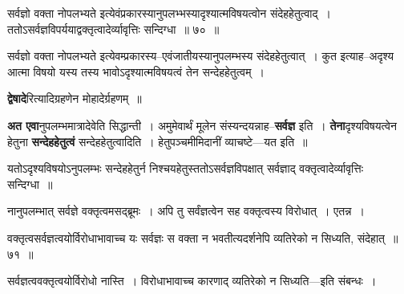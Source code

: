 \documentclass[article,12pt,a4paper]{memoir}
\begin{document}
	  \pstart {}सर्वज्ञो वक्ता नोपलभ्यते इत्येवंप्रकारस्यानुपलभ्भस्यादृश्यात्मविषयत्वोन संदेहहेतुत्वाद् । ततोऽसर्वज्ञविपर्ययाद्वक्तृत्वादेर्व्यावृत्तिः सन्दिग्धा ॥ ७० ॥
	\pend
      
	  \endgroup
	 

	  \pstart सर्वज्ञो वक्ता नोपलभ्यते इत्येवम्प्रकारस्य--एवंजातीयस्यानुपलम्भस्य संदेहहेतुत्वात् । कुत इत्याह--अदृश्य आत्मा विषयो यस्य तस्य भावोऽदृश्यात्मविषयत्वं तेन सन्देहहेतुत्वम् ।
	\pend
      
	  \endgroup
	

	  \pstart \textbf{द्वेषादे}रित्यादिग्रहणेन मोहादेर्ग्रहणम् ॥
	\pend
      

	  \pstart \textbf{अत एवा}नुपलम्भमात्रादेवेति सिद्धान्ती । अमुमेवार्थं मूलेन संस्यन्दयन्नाह--\textbf{सर्वज्ञ} इति । \textbf{तेना}दृश्यविषयत्वेन हेतुना \textbf{सन्देहहेतुत्वं} सन्देहहेतुत्वादिति । हेतुपञ्चमीमिदानीं व्याचष्टे—यत इति ॥
	\pend
	  \bigskip
	  \begingroup
	

	  \pstart यतोऽदृश्यविषयोऽनुपलम्भः सन्देहहेतुर्न निश्चयहेतुस्ततोऽसर्वज्ञविपक्षात् सर्वज्ञाद् वक्तृत्वादेर्व्यावृत्तिः सन्दिग्धा ॥
	\pend
        

	  \pstart नानुपलम्भात् सर्वज्ञे वक्तृत्वमसद्ब्रूमः । अपि तु सर्वंज्ञत्वेन सह वक्तृत्वस्य विरोधात् । एतन्न ।
	\pend
        
	  \bigskip
	  \begingroup
	

	  \pstart वक्तृत्वसर्वज्ञत्वयोर्विरोधाभावाच्च यः सर्वज्ञः स वक्ता न भवतीत्यदर्शनेपि व्यतिरेको न सिध्यति, संदेहात् ॥ ७१ ॥
	\pend
      
	  \endgroup
	 

	  \pstart सर्वज्ञत्ववक्तृत्वयोर्विरोधो नास्ति । विरोधाभावाच्च कारणाद् व्यतिरेको न सिध्यति—इति संबन्धः ।
	\pend
        
\end{document}
